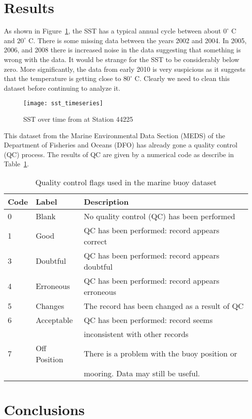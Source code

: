 \documentclass[12pt, letterpaper]{article}
\begin{document}
\section{Results}

As shown in Figure~\ref{fig:sst_timeseries}, the SST has a typical annual cycle between about $0^\circ$ C and $20^\circ$ C. There is some missing data between the years 2002 and 2004.  In 2005, 2006, and 2008 there is
increased noise in the data suggesting that something is wrong with the data.  It would be strange for the SST to be considerably below zero.  More significantly, the data from early 2010 is very suspicious as it suggests that the temperature is getting close to $80^\circ$ C.  Clearly we need to clean this dataset before continuing to analyze it.

\begin{figure}
\texttt{[image: sst\_timeseries]}
\caption{SST over time from at Station 44225}
\label{fig:sst_timeseries}
\end{figure}

This dataset from the Marine Environmental Data Section (MEDS) of the Department of Fisheries and Oceans (DFO) has already gone a quality control (QC) process. The results of QC are given by a numerical code as describe in Table~\ref{tbl:qc_codes}.

\begin{table}[h]
\begin{tabular}{|l|l|l|}
\hline
Code & Label & Description \\
\hline
0 & Blank & No quality control (QC) has been performed \\
1 & Good & QC has been performed: record appears correct \\
3 & Doubtful &  QC has been performed: record appears doubtful \\
4 & Erroneous & QC has been performed: record appears erroneous \\
5 & Changes & The record has been changed as a result of QC \\
6 & Acceptable & QC has been performed: record seems \\  & & inconsistent with other records \\
7 & Off Position & There is a problem with the buoy position or \\ & & mooring. Data may still be useful. \\
\hline
\end{tabular}
\caption{Quality control flags used in the marine buoy dataset}
\label{tbl:qc_codes}
\end{table}

\section{Conclusions}
\end{document}
